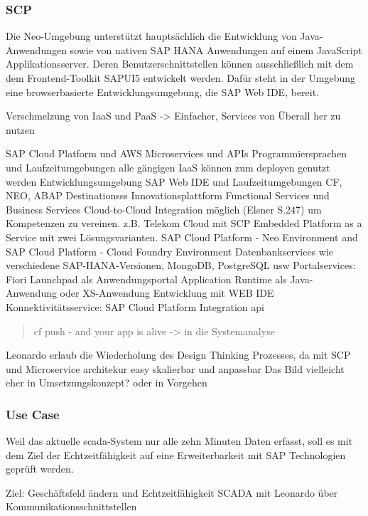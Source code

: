\subsubsection{SCP}

Die Neo-Umgebung unterstützt hauptsächlich die Entwicklung von Java-Anwendungen sowie von nativen SAP HANA Anwendungen auf einem JavaScript Applikationsserver. Deren Benutzerschnittstellen können ausschließlich mit dem dem Frontend-Toolkit SAPUI5 entwickelt werden. Dafür steht in der Umgebung eine browserbasierte Entwicklungsumgebung, die SAP Web IDE, bereit.

Verschmelzung von IaaS und PaaS -> Einfacher, Services von Überall her zu nutzen





SAP Cloud Platform und AWS Microservices und APIs
Programmiersprachen und Laufzeitumgebungen
alle gängigen IaaS können zum deployen genutzt werden
Entwicklungsumgebung SAP Web IDE und Laufzeitumgebungen
CF, NEO, ABAP
Destinationsss
Innovationsplattform
Functional Services und Business Services
Cloud-to-Cloud Integration möglich (Elsner S.247) um Kompetenzen zu vereinen. z.B. Telekom Cloud mit SCP
Embedded Platform as a Service mit zwei Lösungsvarianten. SAP Cloud Platform - Neo Environment and SAP Cloud Platform - Cloud Foundry Environment
Datenbankservices wie verschiedene SAP-HANA-Versionen, MongoDB, PostgreSQL usw
Portalservices: Fiori Launchpad als Anwendungsportal
Application Runtime als Java-Anwendung oder XS-Anwendung Entwicklung mit WEB IDE
Konnektivitätsservice: SAP Cloud Platform Integration
\ac{api}

\begin{quotation}
  cf push - and your app is alive -> in die Systemanalyse
\end{quotation}


Leonardo erlaub die Wiederholung des Design Thinking Prozesses, da mit SCP und Microservice architekur easy skalierbar und anpassbar
Das Bild vielleicht eher in Umsetzungskonzept? oder in Vorgehen

\subsubsection{Use Case}
Weil das aktuelle \ac{scada}-System nur alle zehn Minuten Daten erfasst, soll es mit dem Ziel der Echtzeitfähigkeit auf eine Erweiterbarkeit mit SAP Technologien geprüft werden.

Ziel: Geschäftsfeld ändern und Echtzeitfähigkeit SCADA mit Leonardo über Kommunikationsschnittstellen

